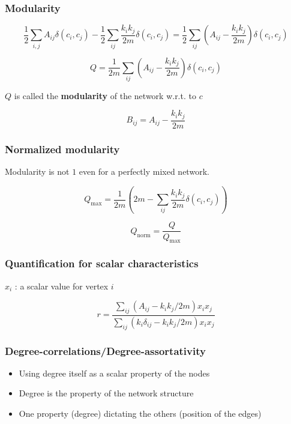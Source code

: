 \documentclass{beamer}
\begin{document}
\begin{frame}
    \frametitle{Modularity}
        $$\frac{1}{2}\sum\limits_{i,j}A_{ij}\delta(c_i,c_j)-\frac{1}{2}\sum\limits_{ij}\frac{k_ik_j}{2m}\delta(c_i,c_j)=\frac{1}{2}\sum\limits_{ij}\left(A_{ij}-\frac{k_ik_j}{2m}\right)\delta(c_i,c_j)$$ 

        \vspace{2em}
        \pause
        $$Q = \frac{1}{2m}\sum\limits_{ij}\left(A_{ij}-\frac{k_ik_j}{2m}\right)\delta(c_i,c_j)$$

        \vspace{2em}
        \centering
        $Q$ is called the {\bf modularity} of the network w.r.t. to $c$

        $$B_{ij}=A_{ij}-\frac{k_ik_j}{2m}$$
\end{frame}
\begin{frame}
    \frametitle{Normalized modularity}
    \centering
    Modularity is not $1$ even for a perfectly mixed network.

    \pause

    $$Q_{\text{max}} = \frac{1}{2m}\left(2m-\sum\limits_{ij}\frac{k_ik_j}{2m}\delta(c_i,c_j)\right)$$

    \pause
    $$Q_{\text{norm}} = \frac{Q}{Q_{\text{max}}}$$
\end{frame}
\begin{frame}
    \frametitle{Quantification for scalar characteristics}
    \centering
    $x_i$ : a scalar value for vertex $i$
    \vspace{1em}

    $$r = \frac{\sum\limits_{ij}(A_{ij}-k_ik_j/2m)x_ix_j}{\sum\limits_{ij}(k_i\delta_{ij}-k_ik_j/2m)x_ix_j}$$
\end{frame}
\begin{frame}
    \frametitle{Degree-correlations/Degree-assortativity}
    
    \begin{itemize}
    \setlength\itemsep{1em}
        \item{Using degree itself as a scalar property of the nodes}
        \item{Degree is the property of the network structure}
        \item{One property (degree) dictating the others (position of the edges)}
    \end{itemize}
\end{frame}
\end{document}
